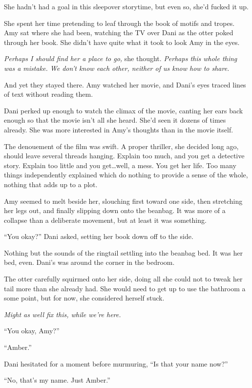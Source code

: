 She hadn't had a goal in this sleepover storytime, but even so, she'd fucked it up.

She spent her time pretending to leaf through the book of motifs and tropes. Amy sat where she had been, watching the TV over Dani as the otter poked through her book. She didn't have quite what it took to look Amy in the eyes.

\emph{Perhaps I should find her a place to go,} she thought. \emph{Perhaps this whole thing was a mistake. We don't know each other, neither of us know how to share.}

And yet they stayed there. Amy watched her movie, and Dani's eyes traced lines of text without reading them.

Dani perked up enough to watch the climax of the movie, canting her ears back enough so that the movie isn't all she heard. She'd seen it dozens of times already. She was more interested in Amy's thoughts than in the movie itself.

The denouement of the film was swift. A proper thriller, she decided long ago, should leave several threads hanging. Explain too much, and you get a detective story. Explain too little and you get\ldots{}well, a mess. You get her life. Too many things independently explained which do nothing to provide a sense of the whole, nothing that adds up to a plot.

Amy seemed to melt beside her, slouching first toward one side, then stretching her legs out, and finally slipping down onto the beanbag. It was more of a collapse than a deliberate movement, but at least it was something.

``You okay?'' Dani asked, setting her book down off to the side.

Nothing but the sounds of the ringtail settling into the beanbag bed. It was her bed, even. Dani's was around the corner in the bedroom.

The otter carefully squirmed onto her side, doing all she could not to tweak her tail more than she already had. She would need to get up to use the bathroom a some point, but for now, she considered herself stuck.

\emph{Might as well fix this, while we're here.}

``You okay, Amy?''

``Amber.''

Dani hesitated for a moment before murmuring, ``Is that your name now?''

``No, that's my name. Just Amber.''

